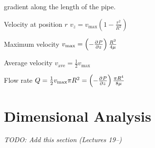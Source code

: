 \documentclass{article}
\begin{document}
\begin{description*}
  gradient along the length of the pipe.
  \begin{description*}
  \item[Velocity at position $r$]
    \(v_z = v_\mathrm{max}\left(1 - \frac{r^2}{R^2}\right)\)
  \item[Maximum velocity]
    \(v_\mathrm{max} = \left(-\pd{P}{z}\right)\frac{R^2}{4\mu}\)
  \item[Average velocity]
    \(v_\mathrm{ave} = \frac{1}{2}v_\mathrm{max}\)
  \item[Flow rate]
    \(Q = \frac{1}{2}v_\mathrm{max}\pi R^2 = \left(-\pd{P}{z}\right)\frac{\pi R^4}{8\mu}\)
  \end{description*}
\end{description*}

\section{Dimensional Analysis}
\emph{TODO: Add this section (Lectures 19--)}
\end{document}
